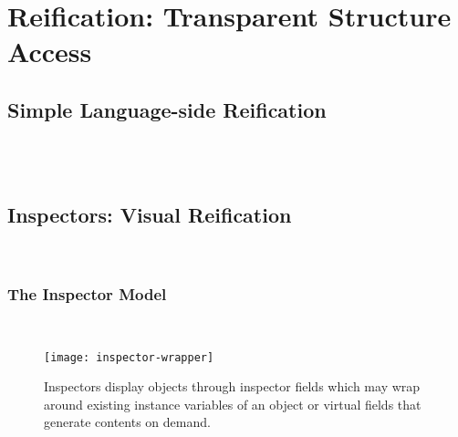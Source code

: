 
\chapter{Reification: Transparent Structure Access}
\minitoc
\introduction



\newpage
\section{Simple Language-side Reification}
 \\
 \\


\section{Inspectors: Visual Reification}
 \\


\subsection{The Inspector Model}
 \\

\begin{figure}[h]
	\centering
	\texttt{[image: inspector-wrapper]}
	\caption[Inspector Model]{Inspectors display objects through inspector fields which may wrap around existing instance variables of an object or virtual fields that generate contents on demand.}
\end{figure}


